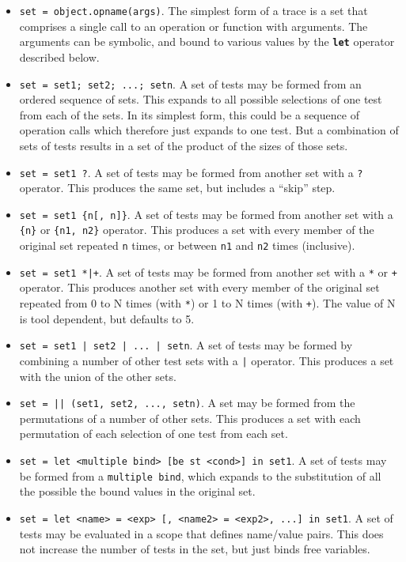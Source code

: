 \documentclass{overturerepchap}
\begin{document}
\begin{itemize}
\item \texttt{set = object.opname(args)}. The simplest form of a trace is a set
that comprises a single call to an operation or function with arguments. The
arguments can be symbolic, and bound to various values by the \texttt{\textbf{let}}
operator described below.
\item \texttt{set = set1; set2; ...; setn}. A set of tests may be formed from
an ordered sequence of sets. This expands to all possible selections of one test
from each of the sets. In its simplest form, this could be a sequence of
operation calls which therefore just expands to one test. But a combination of
sets of tests results in a set of the product of the sizes of those sets.
\item \texttt{set = set1 ?}. A set of tests may be formed from another set with
a \texttt{?} operator. This produces the same set, but includes a ``skip'' step.
\item \texttt{set = set1 \{n[, n]\}}. A set of tests may be formed from another
set with a \texttt{\{n\}} or \texttt{\{n1, n2\}} operator. This produces a set
with every member of the original set repeated \texttt{n} times, or between
\texttt{n1} and \texttt{n2} times (inclusive).
\item \texttt{set = set1 *|+}. A set of tests may be formed from another set
with a \texttt{*} or \texttt{+} operator. This produces another set with every member
of the original set repeated from 0 to N times (with \texttt{*}) or 1 to N times
(with \texttt{+}). The value of N is tool dependent, but defaults to 5.
\item \texttt{set = set1 | set2 | ... | setn}. A set of tests may be formed by
combining a number of other test sets with a \texttt{|} operator. This produces
a set with the union of the other sets.
\item \texttt{set = || (set1, set2, ..., setn)}. A set may be formed from the
permutations of a number of other sets. This produces a set with each
permutation of each selection of one test from each set.
\item \texttt{set = let <multiple bind> [be st <cond>] in set1}. A set of
tests may be formed from a \texttt{multiple bind}, which expands to the
substitution of all the possible the bound values in the original set.
\item \texttt{set = let <name> = <exp> [, <name2> = <exp2>, ...] in set1}. A set
of tests may be evaluated in a scope that defines name/value pairs. This does
not increase the number of tests in the set, but just binds free variables.
\end{itemize}
\end{document}
